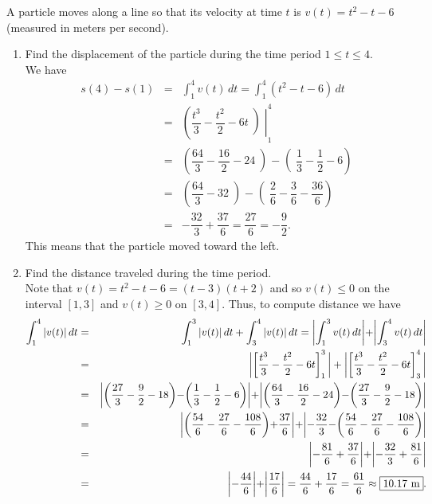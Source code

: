 \documentclass{book}
\newcommand{\dt}{\,dt}
\begin{document}
\begin{Exam} A particle moves along a line so that its velocity at time $t$ is $v(t) = t^2-t-6$ (measured in meters per second).
\begin{enumerate}
\item Find the displacement of the particle during the time period $1\le t\le 4$.\\

We have 
\begin{eqnarray*}
s(4) - s(1) &=& \int_1^4 v(t)\dt = \int_1^4 (t^2-t-6)\dt\\
&=& \left(\dfrac{t^3}{3} - \dfrac{t^2}{2} - 6t\middle)\right|_1^4\\
&=& \left(\dfrac{64}{3} - \dfrac{16}{2} - 24\middle) - \middle(\dfrac{1}{3} - \dfrac{1}{2} - 6\right) \\
&=& \left(\dfrac{64}{3} - 32\middle) - \middle(\dfrac{2}{6} - \dfrac{3}{6} - \dfrac{36}{6}\right)\\
& =& -\dfrac{32}{3} + \dfrac{37}{6}  = \dfrac{27}{6} = -\dfrac{9}{2}.
\end{eqnarray*} This means that the particle moved  toward the left.\\

\item Find the distance traveled during the time period.\\

Note that $v(t) = t^2-t-6 = (t-3)(t+2)$ and so $v(t) \le 0$ on the interval $[1,3]$ and $v(t) \ge 0$ on $[3,4]$. Thus, to compute distance we have
\begin{eqnarray*}
\int_1^4 |v(t)|\dt &=& \int_1^3 |v(t)|\dt + \int_3^4 |v(t)|\dt = \left|\int_1^3 v(t)\dt\middle| + \middle|\int_3^4 v(t)\dt\right|\\
&=& \left|\middle[\dfrac{t^3}{3} - \dfrac{t^2}{2} - 6t\right]_1^3\bigg| + \left|\middle[\dfrac{t^3}{3} - \dfrac{t^2}{2} - 6t\right]_3^4\bigg|\\
&=& \left|\middle(\dfrac{27}{3} - \dfrac{9}{2} - 18\middle) - \middle(\dfrac{1}{3} - \dfrac{1}{2} - 6\middle)\middle| + \middle|\middle(\dfrac{64}{3}-\dfrac{16}{2}-24\middle) - \middle(\dfrac{27}{3} - \dfrac{9}{2} - 18\middle)\right|\\
&=& \left|\middle(\dfrac{54}{6} - \dfrac{27}{6} - \dfrac{108}{6}\middle) + \dfrac{37}{6}\middle| + \middle|-\dfrac{32}{3} - \middle(\dfrac{54}{6} - \dfrac{27}{6} - \dfrac{108}{6}\middle)\right|\\
&=& \left|-\dfrac{81}{6} + \dfrac{37}{6}\middle| + \middle|-\dfrac{32}{3} + \dfrac{81}{6}\right|\\
&=& \left|-\dfrac{44}{6}\middle| + \middle| \dfrac{17}{6}\right| = \dfrac{44}{6} + \dfrac{17}{6} = \dfrac{61}{6} \approx \fbox{10.17 m}. 
\end{eqnarray*}
\end{enumerate}
\end{Exam}\vs
\end{document}
